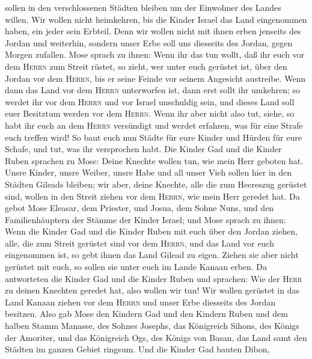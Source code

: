 sollen in den verschlossenen Städten bleiben um der Einwohner des Landes
willen.  Wir wollen nicht heimkehren, bis die Kinder
Israel das Land eingenommen haben, ein jeder sein Erbteil.
 Denn wir wollen nicht mit ihnen erben jenseits des
Jordan und weiterhin, sondern unser Erbe soll uns diesseits des Jordan,
gegen Morgen zufallen.  Mose sprach zu ihnen: Wenn ihr
das tun wollt, daß ihr euch vor dem \textsc{Herrn} zum Streit rüstet,
 so zieht, wer unter euch gerüstet ist, über den Jordan
vor dem \textsc{Herrn}, bis er seine Feinde vor seinem Angesicht
austreibe.  Wenn dann das Land vor dem \textsc{Herrn}
unterworfen ist, dann erst sollt ihr umkehren; so werdet ihr vor dem
\textsc{Herrn} und vor Israel unschuldig sein, und dieses Land soll euer
Besitztum werden vor dem \textsc{Herrn}.  Wenn ihr aber
nicht also tut, siehe, so habt ihr euch an dem \textsc{Herrn} versündigt
und werdet erfahren, was für eine Strafe euch treffen wird!
 So baut euch nun Städte für eure Kinder und Hürden für
eure Schafe, und tut, was ihr versprochen habt.  Die
Kinder Gad und die Kinder Ruben sprachen zu Mose: Deine Knechte wollen
tun, wie mein Herr geboten hat.  Unsre Kinder, unsre
Weiber, unsre Habe und all unser Vieh sollen hier in den Städten Gileads
bleiben;  wir aber, deine Knechte, alle die zum Heereszug
gerüstet sind, wollen in den Streit ziehen vor dem \textsc{Herrn}, wie
mein Herr geredet hat.  Da gebot Mose Eleasar, dem
Priester, und Josua, dem Sohne Nuns, und den Familienhäuptern der Stämme
der Kinder Israel;  und Mose sprach zu ihnen: Wenn die
Kinder Gad und die Kinder Ruben mit euch über den Jordan ziehen, alle,
die zum Streit gerüstet sind vor dem \textsc{Herrn}, und das Land vor
euch eingenommen ist, so gebt ihnen das Land Gilead zu eigen.
 Ziehen sie aber nicht gerüstet mit euch, so sollen sie
unter euch im Lande Kanaan erben.  Da antworteten die
Kinder Gad und die Kinder Ruben und sprachen: Wie der \textsc{Herr} zu
deinen Knechten geredet hat, also wollen wir tun!  Wir
wollen gerüstet in das Land Kanaan ziehen vor dem \textsc{Herrn} und
unser Erbe diesseits des Jordan besitzen.  Also gab Mose
den Kindern Gad und den Kindern Ruben und dem halben Stamm Manasse, des
Sohnes Josephs, das Königreich Sihons, des Königs der Amoriter, und das
Königreich Ogs, des Königs von Basan, das Land samt den Städten im
ganzen Gebiet ringsum.  Und die Kinder Gad bauten Dibon,
